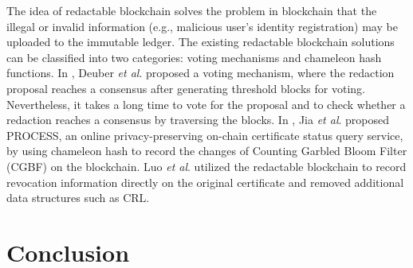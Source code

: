 \documentclass[conference]{IEEEtran}
\begin{document}
The idea of redactable blockchain solves the problem in blockchain that the illegal or invalid information (e.g., malicious user's identity registration) may be uploaded to the immutable ledger.
The existing redactable blockchain solutions can be classified into two categories: voting mechanisms and chameleon hash functions. In \cite{deuberRedactableBlockchainPermissionless2019}, Deuber \textit{et al}. proposed a voting mechanism, where the redaction proposal reaches a consensus after generating threshold blocks for voting. 
Nevertheless, it takes a long time to vote for the proposal and to check whether a redaction reaches a consensus by traversing the blocks. In  \cite{ jiaPROCESSPrivacyPreservingOnChain2021}, Jia \textit{et al}. proposed PROCESS, an online privacy-preserving on-chain certificate status query service, by 
using chameleon hash to record the changes of Counting Garbled Bloom Filter (CGBF) on the blockchain. Luo \textit{et al}. \cite{luoScalaCertScalabilityOrientedPKI2022a} utilized the redactable blockchain to record revocation information directly on the original certificate and removed additional data structures such as CRL.
\section{Conclusion}\label{sec:conclusion}



\end{document}
